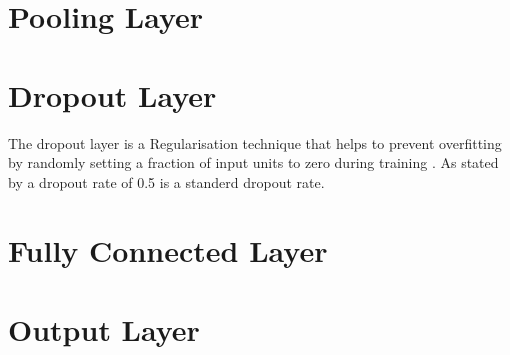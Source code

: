 \documentclass[a4paper,oneside,11pt]{book}
\begin{document}
\section{Pooling Layer}

\section{Dropout Layer}

The dropout layer is a Regularisation technique that helps to prevent overfitting by randomly setting a fraction of input units to zero during training \citep{khan2019regularization}. As stated by \cite{khan2019regularization} a dropout rate of 0.5 is a standerd dropout rate.

\section{Fully Connected Layer}

\section{Output Layer}


\end{document}

